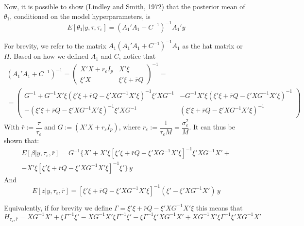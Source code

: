 \documentclass{article}
\begin{document}
Now, it is possible to show (Lindley and Smith, 1972) that the posterior mean of $\theta_1$, conditioned on the model hyperparameters, is
\begin{equation}
E[\theta_1 | y, \tau, \tau_{\varepsilon}] =  \left( A_{1}'A_{1} + C^{-1} \right)^{-1}A_{1}'y
\end{equation}

For brevity, we refer to the matrix $A_1 \left( A_{1}'A_{1} + C^{-1} \right)^{-1}A_{1}$ as the hat matrix or $H$. Based on how we defined $A_1$ and $C$, notice that
\begin{align*}
\left( A_{1}'A_{1} + C^{-1} \right)^{-1} = 
\begin{pmatrix}
 X'X + r_{\varepsilon} I_p & X' \xi \\
 \xi ' X & \xi' \xi + \bar{r} Q
\end{pmatrix}^{-1} = \\ =
\begin{pmatrix}
G^{-1} + G^{-1} X' \xi(\xi ' \xi + \bar{r} Q - \xi ' X G^{-1} X' \xi)^{-1} \xi ' XG^{-1} & 
-G^{-1} X' \xi(\xi ' \xi + \bar{r} Q - \xi ' X G^{-1} X' \xi)^{-1}\\
-  (\xi ' \xi + \bar{r} Q - \xi ' X G^{-1} X' \xi)^{-1} \xi' X G^{-1} & 
 (\xi ' \xi + \bar{r} Q - \xi ' X G^{-1} X' \xi)^{-1}
\end{pmatrix}
\end{align*}
With $\bar{r} := \dfrac{\tau}{\tau_{\varepsilon}}$ and $G := (X'X + r_{\varepsilon}I_p)$, where $r_{\varepsilon} := \dfrac{1}{\tau_{\varepsilon}M} = \dfrac{\sigma_{\varepsilon}^{2}}{M}$.
It can thus be shown that:
\begin{equation}
\begin{aligned}
E[\beta | y, \tau_{\varepsilon}, \bar{r}] = G^{-1} \lbrace X' 
+ X' \xi \left[ \xi' \xi + \bar{r} Q - \xi ' X G^{-1} X' \xi \right]^{-1} \xi' X G^{-1} X' +\\
- X' \xi \left[ \xi' \xi + \bar{r} Q - \xi ' X G^{-1} X' \xi \right]^{-1} \xi'
\rbrace \, y
\end{aligned}
\end{equation}
And
\begin{equation}
E[z | y, \tau_{\varepsilon}, \bar{r}] = \left[ \xi' \xi + \bar{r} Q - \xi ' X G^{-1} X' \xi \right]^{-1}
(\xi' - \xi' X G^{-1} X') \, y
\end{equation}

Equivalently, if for brevity we define $\Gamma = \xi ' \xi + \bar{r} Q - \xi' X G^{-1} X' \xi$ this means that 
\begin{equation}
H_{\tau_{\varepsilon}, \bar{r}} = XG^{-1}X' + \xi \Gamma^{-1} \xi' -
XG^{-1}X' \xi \Gamma^{-1} \xi' -  \xi \Gamma^{-1} \xi'XG^{-1}X'+XG^{-1}X' \xi \Gamma^{-1} \xi' XG^{-1}X'
\end{equation}
\end{document}
